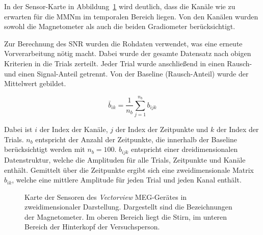\documentclass[doc,a4paper,12pt]{apa6}
\begin{document}
In der Sensor-Karte in Abbildung~\ref{img:sensmap} wird deutlich, dass die Kanäle wie zu erwarten für die MMNm im temporalen Bereich liegen. Von den Kanälen wurden sowohl die Magnetometer als auch die beiden Gradiometer berücksichtigt.

Zur Berechnung des SNR wurden die Rohdaten verwendet, was eine erneute Vorverarbeitung nötig macht. Dabei wurde der gesamte Datensatz nach obigen Kriterien in die Trials zerteilt. Jeder Trial wurde anschließend in einen Rausch- und einen Signal-Anteil getrennt. Von der Baseline (Rausch-Anteil) wurde der Mittelwert gebildet.

\begin{equation}
\bar{b}_{ik} = \frac{1}{n_b} \sum_{j=1}^{n_b} b_{ijk}
\end{equation}

Dabei ist $i$ der Index der Kanäle, $j$ der Index der Zeitpunkte und $k$ der Index der Trials. $n_b$ entspricht der Anzahl der Zeitpunkte, die innerhalb der Baseline berücksichtigt werden mit $n_b = 100$. $b_{ijk}$ entspricht einer dreidimensionalen Datenstruktur, welche die Amplituden für alle Trials, Zeitpunkte und Kanäle enthält. Gemittelt über die Zeitpunkte ergibt sich eine zweidimensionale Matrix $b_{ik}$, welche eine mittlere Amplitude für jeden Trial und jeden Kanal enthält.

\begin{figure}
  \centering
  \setlength{\fboxsep}{5mm}
  \vspace*{3mm}
  \caption[Karte der Sensoren des \emph{Vectorview} MEG-Gerätes]{Karte der Sensoren des \emph{Vectorview} MEG-Gerätes in zweidimensionaler Darstellung. Dargestellt sind die Bezeichnungen der Magnetometer. Im oberen Bereich liegt die Stirn, im unteren Bereich der Hinterkopf der Versuchsperson.}
  \label{img:sensmap}
\end{figure}
\end{document}
